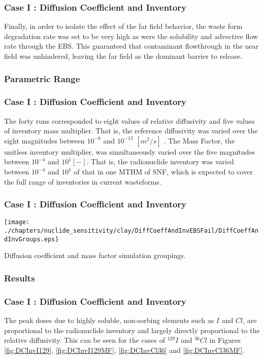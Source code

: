 \begin{frame}[c]
\begin{frame}[c]
\begin{frame}[c]
\begin{frame}[c]
  \frametitle{Case I : Diffusion Coefficient and Inventory}
Finally, in order to isolate the effect of the far field behavior, the waste form 
degradation rate was set to be very high as were the solubility and advective 
flow rate through the  \gls{EBS}. This guaranteed that contaminant flowthrough 
in the near field was unhindered, leaving the far field as the dominant barrier 
to release.


\subsubsection{Parametric Range}
\label{sec:diffCoeffRange}

\begin{frame}[c]
  \frametitle{Case I : Diffusion Coefficient and Inventory}
The forty runs corresponded to eight values of relative diffusivity and five 
values of inventory mass multiplier. That is, the reference diffusivity was varied over the 
eight magnitudes between $ 10^{-8}$ and $10^{-15}$ $[m^2 /s]$ . 
The Mass Factor, the unitless inventory multiplier, was simultaneously varied over 
the five magnitudes between $10^{-4}$ and $10^{1} [-]$. That is, the 
radionuclide inventory was varied between $10^{-4}$ and $10^{1}$ of that in one 
\gls{MTHM} of \gls{SNF}, which is expected to cover the full range of 
inventories in current wasteforms.

\begin{frame}[c]
  \frametitle{Case I : Diffusion Coefficient and Inventory}
\begin{table}[hbp!]
\centering
\texttt{[image: ./chapters/nuclide\_sensitivity/clay/DiffCoeffAndInvEBSFail/DiffCoeffAndInvGroups.eps]}
\caption{Diffusion coefficient and mass factor simulation groupings.}
\label{tab:DiffCoeffAndInvGroups}
\end{table}

\subsubsection{Results}


\begin{frame}[c]
  \frametitle{Case I : Diffusion Coefficient and Inventory}
The peak doses due to highly soluble, non-sorbing elements such as $I$ and $Cl$, 
are  proportional to the radionuclide inventory and 
largely directly proportional to the relative diffusivity. This can be seen for 
the cases of $^{129}I$ and $^{36}Cl$ in Figures \ref{fig:DCInvI129}, 
\ref{fig:DCInvI129MF}, \ref{fig:DCInvCl36} and \ref{fig:DCInvCl36MF}.


\end{frame}
\end{frame}
\end{frame}
\end{frame}
\end{frame}
\end{frame}
\end{frame}
